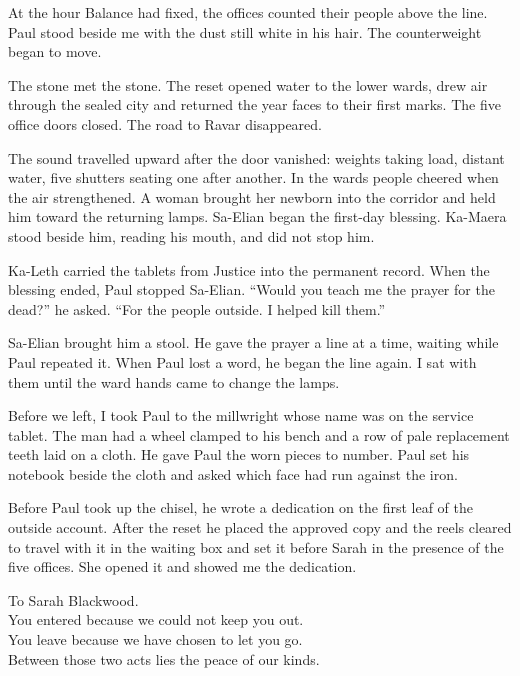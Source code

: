 At the hour Balance had fixed, the offices counted their people above the line. Paul stood beside me with the dust still white in his hair. The counterweight began to move.\par

The stone met the stone. The reset opened water to the lower wards, drew air through the sealed city and returned the year faces to their first marks. The five office doors closed. The road to Ravar disappeared.\par

The sound travelled upward after the door vanished: weights taking load, distant water, five shutters seating one after another. In the wards people cheered when the air strengthened. A woman brought her newborn into the corridor and held him toward the returning lamps. Sa-Elian began the first-day blessing. Ka-Maera stood beside him, reading his mouth, and did not stop him.\par

Ka-Leth carried the tablets from Justice into the permanent record. When the blessing ended, Paul stopped Sa-Elian. ``Would you teach me the prayer for the dead?'' he asked. ``For the people outside. I helped kill them.''\par

Sa-Elian brought him a stool. He gave the prayer a line at a time, waiting while Paul repeated it. When Paul lost a word, he began the line again. I sat with them until the ward hands came to change the lamps.\par

Before we left, I took Paul to the millwright whose name was on the service tablet. The man had a wheel clamped to his bench and a row of pale replacement teeth laid on a cloth. He gave Paul the worn pieces to number. Paul set his notebook beside the cloth and asked which face had run against the iron.\par

\ornament

Before Paul took up the chisel, he wrote a dedication on the first leaf of the outside account. After the reset he placed the approved copy and the reels cleared to travel with it in the waiting box and set it before Sarah in the presence of the five offices. She opened it and showed me the dedication.\par

\begin{scripture}
To Sarah Blackwood.\\
You entered because we could not keep you out.\\
You leave because we have chosen to let you go.\\
Between those two acts lies the peace of our kinds.
\end{scripture}

